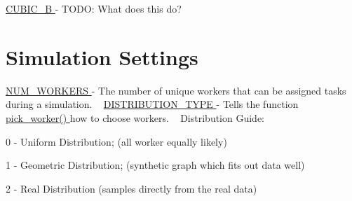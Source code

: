  \hyperlink{namespacedynamicfilterapp_1_1toggles_a2d4f2e30d34616c754114da7b5c88000}{C\+U\+B\+I\+C\+\_\+B } -\/ T\+O\+DO\+: What does this do? ~\newline
 \hypertarget{toggles_sim}{}\section{Simulation Settings}\label{toggles_sim}
\hyperlink{namespacedynamicfilterapp_1_1toggles_a806fc12166c09fa5baabfcbe218040ae}{N\+U\+M\+\_\+\+W\+O\+R\+K\+E\+RS } -\/ The number of unique workers that can be assigned tasks during a simulation. ~\newline
 \hyperlink{namespacedynamicfilterapp_1_1toggles_aceed21fa0675802d2f756c7da43cb049}{D\+I\+S\+T\+R\+I\+B\+U\+T\+I\+O\+N\+\_\+\+T\+Y\+PE } -\/ Tells the function \hyperlink{}{pick\+\_\+worker() } how to choose workers. ~\newline
Distribution Guide\+:
\begin{DoxyItemize}
\item 0 -\/ Uniform Distribution; (all worker equally likely)
\item 1 -\/ Geometric Distribution; (synthetic graph which fits out data well)
\item 2 -\/ Real Distribution (samples directly from the real data)
\end{DoxyItemize}

